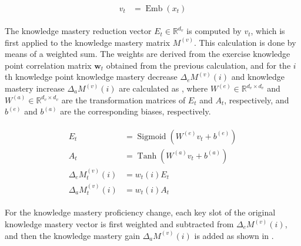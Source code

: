 \begin{align}\label{fml:ch3-write-vt}
    \begin{split}
        v_t &= \operatorname{Emb}(x_t)
    \end{split}
\end{align}


The knowledge mastery reduction vector \(E_t\in\mathbb{R}^{d_v}\) is computed by \(v_t\), which is first applied to the knowledge mastery matrix \(M^{(v)}\). This calculation is done by means of a weighted sum. The weights are derived from the exercise knowledge point correlation matrix \(\mathbf{w}_t\) obtained from the previous calculation, and for the \(i\)th knowledge point knowledge mastery decrease \(\Delta_e{M^{(v)}(i)}\) and knowledge mastery increase \(\Delta_a{M^{(v)}(i)}\) are calculated as \eqname{\ref{fml:ch3-write-delta}}, where \(W^{(e)}\in\mathbb{R}^{d_v \times d_v}\) and \(W^{(a)}\in\mathbb{R}^{d_v \times d_v}\) are the transformation matrices of \(E_t\) and \(A_t\), respectively, and \(b^{(e)}\) and \(b^{(a)} \) are the corresponding biases, respectively.

\begin{align}\label{fml:ch3-write-delta}
    \begin{split}
        E_t &= \operatorname{Sigmoid}(W^{(e)}v_t+b^{(e)})\\
        A_t &= \operatorname{Tanh}(W^{(a)}v_t+b^{(a)})\\
        \Delta_e{M^{(v)}_t(i)} & = w_t(i) E_t \\
        \Delta_a{M^{(v)}_t(i)} & = w_t(i) A_t
    \end{split}
\end{align}


For the knowledge mastery proficiency change, each key slot of the original knowledge mastery vector is first weighted and subtracted from \(\Delta_e{M^{(v)}(i)}\), and then the knowledge mastery gain \(\Delta_a{M^{(v)}(i)}\) is added as shown in \eqname{\ref{fml:ch3-modify}}.

